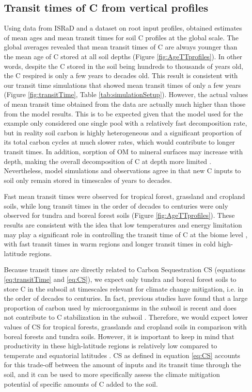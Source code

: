 \documentclass[11pt, oneside, a4paper]{article}   	%
\begin{document}
\subsection{Transit times of C from vertical profiles}
Using data from ISRaD and a dataset on root input profiles, \citet{Xiao2022} obtained estimates of mean ages and mean transit times for soil C profiles at the global scale. The global averages revealed that mean transit times of C are always younger than the mean age of C stored at all soil depths (Figure \ref{fig:AgeTTprofiles}). In other words, despite the C stored in the soil being hundreds to thousands of years old, the C respired is only a few years to decades old. This result is consistent with our transit time simulations that showed mean transit times of only a few years (Figure \ref{fig:transitTime}, Table \ref{tab:simulationSetup}). However, the actual values of mean transit time obtained from the data are actually much higher than those from the model results. This is to be expected given that the model used for the example only considered one single pool with a relatively fast decomposition rate, but in reality soil carbon is highly heterogeneous and a significant proportion of its total carbon cycles at much slower rates, which would contribute to longer transit times.  In addition, sorption of OM to mineral surfaces may increase with depth, making the overall decomposition of C at depth more limited \citep{Ahrens2020}. Nevertheless, model simulations and observations agree in that new C inputs to soil only remain stored in timescales of years to decades. 

Fast mean transit times were observed for tropical forest, grassland and cropland soils, while long transit times in the order of decades to centuries were only observed for tundra and boreal forest soils (Figure \ref{fig:AgeTTprofiles}). These results are consistent with the idea that low temperatures and energy limitation may play a significant role in controlling the transit time of C at the biome level \citep{Lu2018, Xiao2022, Sierra2023PTRS}, with fast transit times in warm regions and longer transit times in cold high-latitude regions.

Because transit times are directly related to Carbon Sequestration CS (equations \ref{eq:transitTime} and \ref{eq:CS}), we expect only tundra and boreal forest soils to store C in the subsoil at timescales relevant for climate change mitigation, i.e. in the order of decades to centuries. In fact, previous studies have found that a large proportion of carbon used by microorganisms in the subsoil is recent and does not contribute to C stabilization in the subsoil \citep{Balesdent2018, Scheibe2023}. Therefore, we would expect lower values of CS for tropical forests, grasslands and cropland soils in comparison with boreal forests and tundra soils. 
However, it is important to keep in mind that productivity in these high-latitude regions is relatively low compared to temperate and equatorial latitudes \citep{Xiao2023}. CS as defined in equation \ref{eq:CS} accounts for this trade-off between the amount of inputs and its transit time through the soil, and it can be used to more specifically assess the climate mitigation potential of specific amounts of C added to the soil.
\end{document}
